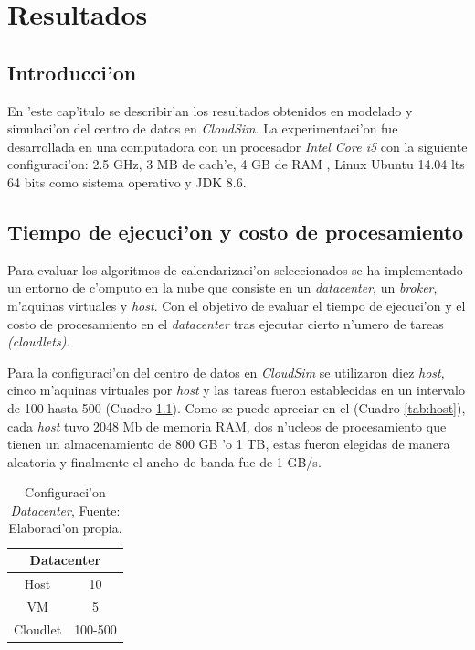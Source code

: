 \chapter{Resultados}
\section*{Introducci'on}

En 'este cap'itulo se describir'an los resultados obtenidos en modelado y simulaci'on del centro de datos en \textit{CloudSim}. La experimentaci'on fue desarrollada en una computadora con  un procesador \textit{Intel Core i5}  con la siguiente configuraci'on: 2.5 GHz, 3 MB de cach'e, 4 GB de RAM , Linux Ubuntu 14.04 lts 64 bits como sistema operativo y JDK 8.6.






\vspace{20em} 

\section{Tiempo de ejecuci'on y costo de procesamiento}


Para evaluar los algoritmos de calendarizaci'on seleccionados se ha implementado un entorno de c'omputo en la nube que consiste en un \textit{datacenter}, un \textit{broker}, m'aquinas virtuales y \textit{host}.  Con el objetivo de evaluar el tiempo de ejecuci'on y el costo de procesamiento en el \textit{datacenter} tras ejecutar cierto n'umero de tareas \textit{(cloudlets)}.

Para la configuraci'on del centro de datos en \textit{CloudSim} se utilizaron diez \textit{host}, cinco m'aquinas virtuales por \textit{host} y las tareas fueron establecidas en un intervalo de 100 hasta 500 (Cuadro \ref{table:datacenter}).
Como se puede apreciar en el (Cuadro \ref{tab:host}), cada \textit{host} tuvo 2048 Mb de memoria RAM, dos n'ucleos de procesamiento que tienen un almacenamiento de 800 GB 'o 1 TB, estas fueron elegidas de manera aleatoria y finalmente el ancho de banda fue de 1 GB/s.

\setcounter{table}{0}
\renewcommand\thetable{\arabic{table}}
\begin{table}[h!]
	\centering
	\begin{tabular}{@{}cc@{}}
		\toprule
		\multicolumn{2}{c}{{\bf Datacenter}} \\ \midrule
		Host              & 10               \\
		VM                & 5                \\
		Cloudlet          & 100-500          \\ \bottomrule
		
	\end{tabular}
	\caption{Configuraci'on \textit{Datacenter}, Fuente: Elaboraci'on propia.}
	\label{table:datacenter}
\end{table}
 

